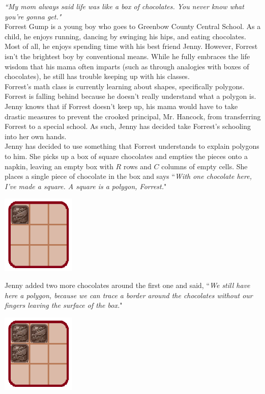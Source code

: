 
\textit{``My mom always said life was like a box of chocolates. You never know what you're gonna get."}\\

Forrest Gump is a young boy who goes to Greenbow County Central School. As a child, he enjoys running, dancing by swinging his hips, and eating chocolates. Most of all, he enjoys spending time with his best friend Jenny. However, Forrest isn't the brightest boy by conventional means. While he fully embraces the life wisdom that his mama often imparts (such as through analogies with boxes of chocolates), he still has trouble keeping up with his classes.\\

Forrest's math class is currently learning about shapes, specifically polygons. Forrest is falling behind because he doesn't really understand what a polygon is. Jenny knows that if Forrest doesn't keep up, his mama would have to take drastic measures to prevent the crooked principal, Mr. Hancock, from transferring Forrest to a special school. As such, Jenny has decided take Forrest's schooling into her own hands.\\

Jenny has decided to use something that Forrest understands to explain polygons to him. She picks up a box of square chocolates and empties the pieces onto a napkin, leaving an empty box with $R$ rows and $C$ columns of empty cells. She places a single piece of chocolate in the box and says ``\textit{With one chocolate here, I've made a square. A square is a polygon, Forrest.}"

\begin{center}\includegraphics[width=100pt]{chocolates1.png}\end{center}

Jenny added two more chocolates around the first one and said, ``\textit{We still have here a polygon, because we can trace a border around the chocolates without our fingers leaving the surface of the box.}"

\begin{center}\includegraphics[width=100pt]{chocolates2.png}\end{center}

